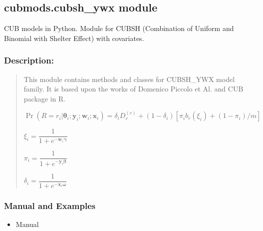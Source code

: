 \documentclass[letterpaper,10pt,english]{sphinxmanual}
\begin{document}
\subsection{cubmods.cubsh\_ywx module}
\label{\detokenize{cubmods:module-cubmods.cubsh_ywx}}\label{\detokenize{cubmods:cubmods-cubsh-ywx-module}}
\sphinxAtStartPar
CUB models in Python.
Module for CUBSH (Combination of Uniform
and Binomial with Shelter Effect) with covariates.


\subsubsection{Description:}
\label{\detokenize{cubmods:id110}}\begin{quote}

\sphinxAtStartPar
This module contains methods and classes
for CUBSH\_YWX model family.
It is based upon the works of Domenico
Piccolo et Al. and CUB package in R.

\sphinxAtStartPar
\(\Pr(R=r_i|\pmb\theta_i;\pmb y_i; \pmb w_i; \pmb x_i) = \delta_i D_r^{(c)} + (1 - \delta_i)[ \pi_i b_r(\xi_i) + (1-\pi_i)/m ]\)

\sphinxAtStartPar
\(\xi_i = \dfrac{1}{1+e^{-\pmb w_i \pmb\gamma}}\)

\sphinxAtStartPar
\(\pi_i = \dfrac{1}{1+e^{-\pmb y_i \pmb\beta}}\)

\sphinxAtStartPar
\(\delta_i = \dfrac{1}{1+e^{-\pmb x_i \pmb\omega}}\)
\end{quote}


\subsubsection{Manual and Examples}
\label{\detokenize{cubmods:id111}}\begin{itemize}
\item {} 
\sphinxAtStartPar
Manual 

\end{itemize}
\end{document}
